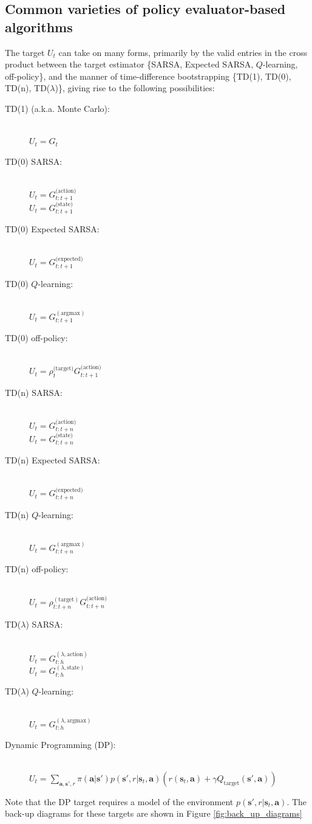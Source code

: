\documentclass{article}
\begin{document}
\subsection{Common varieties of policy evaluator-based algorithms}

The target $U_t$ can take on many forms, primarily by the valid entries in the cross product between the target estimator \{SARSA, Expected SARSA, $Q$-learning, off-policy\}, and the manner of time-difference bootstrapping \{TD(1), TD(0), TD(n), TD($\lambda$)\}, giving rise to the following possibilities:
 \begin{description}
\item[TD(1) (a.k.a. Monte Carlo):]\hfill \\ 
$U_t=G_t$
\item[TD(0) SARSA:]\hfill \\ 
$U_t=G_{t:t+1}^\text{(action)}$\\
$U_t=G_{t:t+1}^\text{(state)}$
\item[TD(0) Expected SARSA:]\hfill \\ 
$U_t=G_{t:t+1}^\text{(expected)}$
\item[TD(0) $Q$-learning:]\hfill \\ 
$U_t=G_{t:t+1}^{(\text{argmax})}$
\item[TD(0) off-policy:]\hfill \\ 
$U_t=\rho^\text{(target)}_{t}G_{t:t+1}^\text{(action)}$
\item[TD(n) SARSA:]\hfill \\
$U_t=G_{t:t+n}^\text{(action)}$\\
$U_t=G_{t:t+n}^\text{(state)}$
\item[TD(n) Expected SARSA:]\hfill \\
$U_t=G_{t:t+n}^\text{(expected)}$
\item[TD(n) $Q$-learning:]\hfill \\
$U_t=G_{t:t+n}^{(\text{argmax})}$
\item[TD(n) off-policy:]\hfill \\ 
$U_t=\rho_{t:t+n}^{(\text{target})}G_{t:t+n}^\text{(action)}$
\item[TD($\lambda$) SARSA:]\hfill \\ 
$U_t=G_{t:h}^{(\lambda,\text{action})}$\\
$U_t=G_{t:h}^{(\lambda,\text{state})}$
\item[TD($\lambda$) $Q$-learning:]\hfill \\ 
$U_t=G_{t:h}^{(\lambda,\text{argmax})}$
\item[Dynamic Programming (DP):]\hfill \\ 
$U_t=\sum_{\mathbf{a},\mathbf{s}',r}\pi(\mathbf{a}|\mathbf{s}')p(\mathbf{s}',r|\mathbf{s}_t,\mathbf{a})\left(r(\mathbf{s}_t,\mathbf{a})+\gamma Q_\text{target}(\mathbf{s}',\mathbf{a})\right)$
\end{description}Note that the DP target requires a model of the environment $p(\mathbf{s}',r|\mathbf{s}_t,\mathbf{a})$. The back-up diagrams for these targets are shown in Figure \ref{fig:back_up_diagrams}
\end{document}
